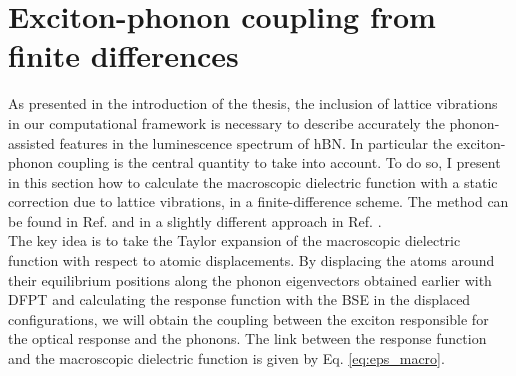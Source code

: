 %
\section{Exciton-phonon coupling from finite differences} \label{sec:excph_fdd}
As presented in the introduction of the thesis, the inclusion of lattice vibrations in our computational framework is necessary to describe accurately the phonon-assisted features in the luminescence spectrum of hBN. In particular the exciton-phonon coupling is the central quantity to take into account. To do so, I present in this section how to calculate the macroscopic dielectric function with a static correction due to lattice vibrations, in a finite-difference scheme. The method can be found in Ref. \cite{paleari2019exciton} and in a slightly different approach in Ref. \cite{cannuccia2019theory}.\\
The key idea is to take the Taylor expansion of the macroscopic dielectric function with respect to atomic displacements. By displacing the atoms around their equilibrium positions along the phonon eigenvectors obtained earlier with \acrshort{DFPT} and calculating the response function with the \acrshort{BSE} in the displaced configurations, we will obtain the coupling between the exciton responsible for the optical response and the phonons. The link between the response function and the macroscopic dielectric function is given by Eq. \eqref{eq:eps_macro}. 

